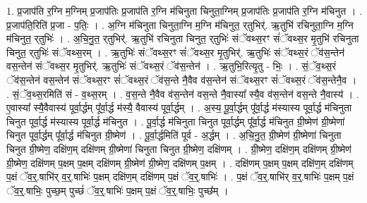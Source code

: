 \documentclass[17pt]{extarticle}
\begin{document}
1. प्र॒जाप॑ति र॒ग्नि म॒ग्निम् प्र॒जाप॑तिः प्र॒जाप॑ति र॒ग्नि म॑चिनुता चिनुता॒ग्निम् प्र॒जाप॑तिः प्र॒जाप॑ति र॒ग्नि म॑चिनुत । . प्र॒जाप॑ति॒रिति॑ प्र॒जा - प॒तिः॒ । . अ॒ग्नि म॑चिनुता चिनुता॒ग्नि म॒ग्नि म॑चिनुत॒ र्‌तुभिर्॑. ऋ॒तुभि॑ रचिनुता॒ग्नि म॒ग्नि म॑चिनुत॒ र्‌तुभिः॑ । . अ॒चि॒नु॒त॒ र्‌तुभिर्॑. ऋ॒तुभि॑ रचिनुता चिनुत॒ र्‌तुभिः॑ संॅवथ्स॒रꣳ सं॑ॅवथ्स॒र मृ॒तुभि॑ रचिनुता चिनुत॒ र्‌तुभिः॑ संॅवथ्स॒रम् । . ऋ॒तुभिः॑ संॅवथ्स॒रꣳ सं॑ॅवथ्स॒र मृ॒तुभिर्॑. ऋ॒तुभिः॑ संॅवथ्स॒रं ॅव॑स॒न्तेन॑ वस॒न्तेन॑ संॅवथ्स॒र मृ॒तुभिर्॑. ऋ॒तुभिः॑ संॅवथ्स॒रं ॅव॑स॒न्तेन॑ । . ऋ॒तुभि॒रित्यृ॒तु - भिः॒ । . सं॒ॅव॒थ्स॒रं ॅव॑स॒न्तेन॑ वस॒न्तेन॑ संॅवथ्स॒रꣳ सं॑ॅवथ्स॒रं ॅव॑स॒न्ते नै॒वैव व॑स॒न्तेन॑ संॅवथ्स॒रꣳ सं॑ॅवथ्स॒रं ॅव॑स॒न्तेनै॒व । . सं॒ॅव॒थ्स॒रमिति॑ सं - व॒थ्स॒रम् । . व॒स॒न्ते नै॒वैव व॑स॒न्तेन॑ वस॒न्ते नै॒वास्या᳚ स्यै॒व व॑स॒न्तेन॑ वस॒न्ते नै॒वास्य॑ । . ए॒वास्या᳚ स्यै॒वैवास्य॑ पूर्वा॒र्द्धम् पू᳚र्वा॒र्द्ध म॑स्यै॒ वैवास्य॑ पूर्वा॒र्द्धम् । . अ॒स्य॒ पू॒र्वा॒र्द्धम् पू᳚र्वा॒र्द्ध म॑स्यास्य पूर्वा॒र्द्ध म॑चिनुता चिनुत पूर्वा॒र्द्ध म॑स्यास्य पूर्वा॒र्द्ध म॑चिनुत । . पू॒र्वा॒र्द्ध म॑चिनुता चिनुत पूर्वा॒र्द्धम् पू᳚र्वा॒र्द्ध म॑चिनुत ग्री॒ष्मेण॑ ग्री॒ष्मेणा॑ चिनुत पूर्वा॒र्द्धम् पू᳚र्वा॒र्द्ध म॑चिनुत ग्री॒ष्मेण॑ । . पू॒र्वा॒र्द्धमिति॑ पूर्व - अ॒र्द्धम् । . अ॒चि॒नु॒त॒ ग्री॒ष्मेण॑ ग्री॒ष्मेणा॑ चिनुता चिनुत ग्री॒ष्मेण॒ दक्षि॑ण॒म् दक्षि॑णम् ग्री॒ष्मेणा॑ चिनुता चिनुत ग्री॒ष्मेण॒ दक्षि॑णम् । . ग्री॒ष्मेण॒ दक्षि॑ण॒म् दक्षि॑णम् ग्री॒ष्मेण॑ ग्री॒ष्मेण॒ दक्षि॑णम् प॒क्षम् प॒क्षम् दक्षि॑णम् ग्री॒ष्मेण॑ ग्री॒ष्मेण॒ दक्षि॑णम् प॒क्षम् । . दक्षि॑णम् प॒क्षम् प॒क्षम् दक्षि॑ण॒म् दक्षि॑णम् प॒क्षं ॅव॒र्॒.षाभि॑र् व॒र्॒.षाभिः॑ प॒क्षम् दक्षि॑ण॒म् दक्षि॑णम् प॒क्षं ॅव॒र्॒.षाभिः॑ । . प॒क्षं ॅव॒र्॒.षाभि॑र् व॒र्॒.षाभिः॑ प॒क्षम् प॒क्षं ॅव॒र्॒.षाभिः॒ पुच्छ॒म् पुच्छं॑ ॅव॒र्॒.षाभिः॑ प॒क्षम् प॒क्षं ॅव॒र्॒.षाभिः॒ पुच्छ᳚म् । \newline
\end{document}
